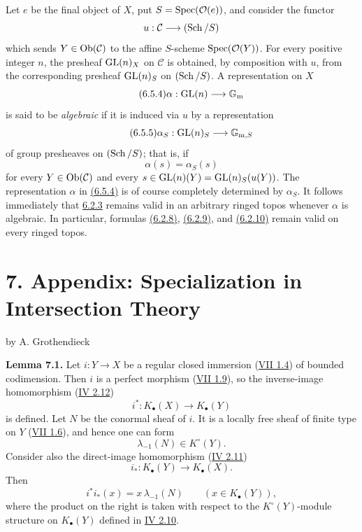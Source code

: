 Let $e$ be the final object of $X$, put
$S=\operatorname{Spec}(\mathcal O(e))$, and consider the functor
\[
u:\mathcal C\longrightarrow(\operatorname{Sch}/S)
\]
which sends $Y\in\operatorname{Ob}(\mathcal C)$ to the affine $S$-scheme
$\operatorname{Spec}(\mathcal O(Y))$. For every positive integer $n$, the presheaf
$\operatorname{GL}(n)_X$ on $\mathcal C$ is obtained, by composition with $u$, from the
corresponding presheaf $\operatorname{GL}(n)_S$ on $(\operatorname{Sch}/S)$. A representation on $X$
\begin{equation}\tag{6.5.4}
\alpha:\operatorname{GL}(n)\longrightarrow\mathbb G_{\mathrm m}
\end{equation}
is said to be \emph{algebraic} if it is induced via $u$ by a representation
\begin{equation}\tag{6.5.5}
\alpha_S:\operatorname{GL}(n)_S\longrightarrow\mathbb G_{\mathrm m,S}
\end{equation}
of group presheaves on $(\operatorname{Sch}/S)$; that is, if
\[
\alpha(s)=\alpha_S(s)
\]
for every $Y\in\operatorname{Ob}(\mathcal C)$ and every
$s\in\operatorname{GL}(n)(Y)=\operatorname{GL}(n)_S(u(Y))$. The representation $\alpha$ in \hyperlink{sga6.e10.eq.6-5-4}{(6.5.4)} is
of course completely determined by $\alpha_S$. It follows immediately that
\hyperlink{sga6.e10.cor.6-2-3}{6.2.3} remains valid in an arbitrary ringed topos whenever $\alpha$ is
algebraic. In particular, formulas \hyperlink{sga6.e10.eq.6-2-8}{(6.2.8)}, \hyperlink{sga6.e10.eq.6-2-9}{(6.2.9)}, and \hyperlink{sga6.e10.eq.6-2-10}{(6.2.10)} remain
valid on every ringed topos.

\section*{7. Appendix: Specialization in Intersection Theory}
\begin{center}
by A. Grothendieck
\end{center}

\textbf{Lemma 7.1.}
Let $i:Y\to X$ be a regular closed immersion (\hyperlink{sga6.e07.def.1-4}{VII 1.4}) of bounded
codimension. Then $i$ is a perfect morphism (\hyperlink{sga6.e07.prop.1-9}{VII 1.9}), so the inverse-image
homomorphism (\hyperlink{sga6.e04.para.2-12}{IV 2.12})
\[
i^*:K_\bullet(X)\longrightarrow K_\bullet(Y)
\]
is defined. Let $N$ be the conormal sheaf of $i$. It is a locally free
sheaf of finite type on $Y$ (\hyperlink{sga6.e07.def.1-6}{VII 1.6}), and hence one can form
\[
\lambda_{-1}(N)\in K^\circ(Y).
\]
Consider also the direct-image homomorphism (\hyperlink{sga6.e04.para.2-11}{IV 2.11})
\[
i_*:K_\bullet(Y)\longrightarrow K_\bullet(X).
\]
Then
\[
i^*i_*(x)=x\,\lambda_{-1}(N)\qquad(x\in K_\bullet(Y)),
\]
where the product on the right is taken with respect to the
$K^\circ(Y)$-module structure on $K_\bullet(Y)$ defined in \hyperlink{sga6.e04.para.2-10}{IV 2.10}.

